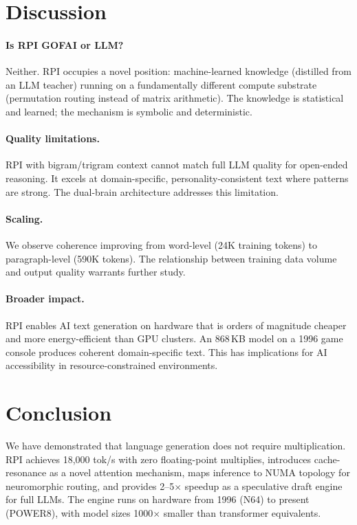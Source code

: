 \documentclass[10pt,twocolumn]{article}
\begin{document}
\section{Discussion}
\label{sec:discussion}

\paragraph{Is RPI GOFAI or LLM?} Neither. RPI occupies a novel position: machine-learned knowledge (distilled from an LLM teacher) running on a fundamentally different compute substrate (permutation routing instead of matrix arithmetic). The knowledge is statistical and learned; the mechanism is symbolic and deterministic.

\paragraph{Quality limitations.} RPI with bigram/trigram context cannot match full LLM quality for open-ended reasoning. It excels at domain-specific, personality-consistent text where patterns are strong. The dual-brain architecture addresses this limitation.

\paragraph{Scaling.} We observe coherence improving from word-level (24K training tokens) to paragraph-level (590K tokens). The relationship between training data volume and output quality warrants further study.

\paragraph{Broader impact.} RPI enables AI text generation on hardware that is orders of magnitude cheaper and more energy-efficient than GPU clusters. An 868\,KB model on a 1996 game console produces coherent domain-specific text. This has implications for AI accessibility in resource-constrained environments.

\section{Conclusion}

We have demonstrated that language generation does not require multiplication. RPI achieves 18,000 tok/s with zero floating-point multiplies, introduces cache-resonance as a novel attention mechanism, maps inference to NUMA topology for neuromorphic routing, and provides 2--5$\times$ speedup as a speculative draft engine for full LLMs. The engine runs on hardware from 1996 (N64) to present (POWER8), with model sizes 1000$\times$ smaller than transformer equivalents.
\end{document}

